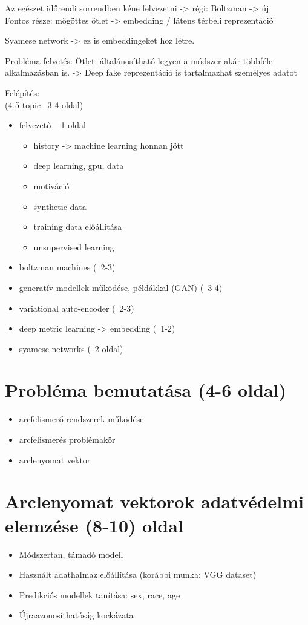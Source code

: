 Az egészet időrendi sorrendben kéne felvezetni -> régi: Boltzman -> új \\
Fontos része: mögöttes ötlet -> embedding / látens térbeli reprezentáció

Syamese network -> ez is embeddingeket hoz létre.

Probléma felvetés:
Ötlet: általánosítható legyen a módszer akár többféle alkalmazásban is. -> Deep fake reprezentáció is tartalmazhat személyes adatot

Felépítés: \\
(4-5 topic ~3-4 oldal)
\begin{itemize}
	\item felvezető ~ 1 oldal 
	\begin{itemize}
		\item history -> machine learning honnan jött
		\item deep learning, gpu, data
		\item motiváció
		\item synthetic data
		\item training data előállítása
		\item unsupervised learning
	\end{itemize}
	\item boltzman machines (~2-3)
	\item generatív modellek működése, példákkal (GAN) (~3-4)
	\item variational auto-encoder (~2-3)
	\item deep metric learning -> embedding (~1-2)
	\item syamese networks (~2 oldal)
\end{itemize}

\section{Probléma bemutatása (4-6 oldal)} 
\begin{itemize}
	\item arcfelismerő rendszerek működése
	\item arcfelismerés problémakör
	\item arclenyomat vektor
\end{itemize}

\section{Arclenyomat vektorok adatvédelmi elemzése (8-10) oldal}
\begin{itemize}
	\item Módszertan, támadó modell 
	\item Használt adathalmaz előállítása (korábbi munka:
	VGG dataset) 
	\item Predikciós modellek tanítása: sex, race, age 
	\item Újraazonosíthatóság kockázata
\end{itemize}

